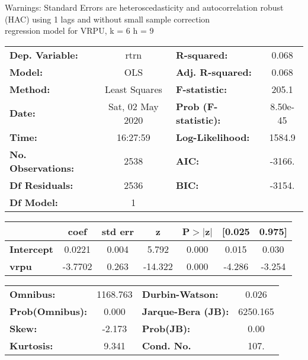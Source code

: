 Warnings: \newline
 [1] Standard Errors are heteroscedasticity and autocorrelation robust (HAC) using 1 lags and without small sample correction\\ 

regression model for VRPU, k = 6 h = 9\begin{center}
\begin{tabular}{lclc}
\toprule
\textbf{Dep. Variable:}    &       rtrn       & \textbf{  R-squared:         } &     0.068   \\
\textbf{Model:}            &       OLS        & \textbf{  Adj. R-squared:    } &     0.068   \\
\textbf{Method:}           &  Least Squares   & \textbf{  F-statistic:       } &     205.1   \\
\textbf{Date:}             & Sat, 02 May 2020 & \textbf{  Prob (F-statistic):} &  8.50e-45   \\
\textbf{Time:}             &     16:27:59     & \textbf{  Log-Likelihood:    } &    1584.9   \\
\textbf{No. Observations:} &        2538      & \textbf{  AIC:               } &    -3166.   \\
\textbf{Df Residuals:}     &        2536      & \textbf{  BIC:               } &    -3154.   \\
\textbf{Df Model:}         &           1      & \textbf{                     } &             \\
\bottomrule
\end{tabular}
\begin{tabular}{lcccccc}
                   & \textbf{coef} & \textbf{std err} & \textbf{z} & \textbf{P$> |$z$|$} & \textbf{[0.025} & \textbf{0.975]}  \\
\midrule
\textbf{Intercept} &       0.0221  &        0.004     &     5.792  &         0.000        &        0.015    &        0.030     \\
\textbf{vrpu}      &      -3.7702  &        0.263     &   -14.322  &         0.000        &       -4.286    &       -3.254     \\
\bottomrule
\end{tabular}
\begin{tabular}{lclc}
\textbf{Omnibus:}       & 1168.763 & \textbf{  Durbin-Watson:     } &    0.026  \\
\textbf{Prob(Omnibus):} &   0.000  & \textbf{  Jarque-Bera (JB):  } & 6250.165  \\
\textbf{Skew:}          &  -2.173  & \textbf{  Prob(JB):          } &     0.00  \\
\textbf{Kurtosis:}      &   9.341  & \textbf{  Cond. No.          } &     107.  \\
\bottomrule
\end{tabular}
\end{center}

